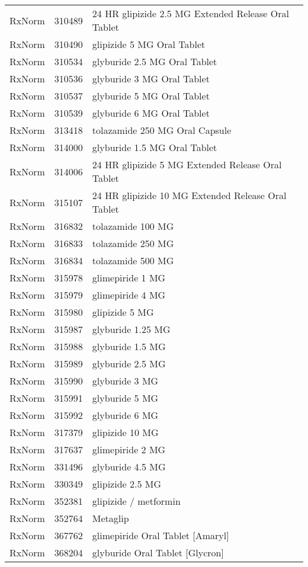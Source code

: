 \begin{longtable}{p{}p{}p{}}
  RxNorm & 310489 & 24 HR glipizide 2.5 MG Extended Release Oral Tablet \\ 
  RxNorm & 310490 & glipizide 5 MG Oral Tablet \\ 
  RxNorm & 310534 & glyburide 2.5 MG Oral Tablet \\ 
  RxNorm & 310536 & glyburide 3 MG Oral Tablet \\ 
  RxNorm & 310537 & glyburide 5 MG Oral Tablet \\ 
  RxNorm & 310539 & glyburide 6 MG Oral Tablet \\ 
  RxNorm & 313418 & tolazamide 250 MG Oral Capsule \\ 
  RxNorm & 314000 & glyburide 1.5 MG Oral Tablet \\ 
  RxNorm & 314006 & 24 HR glipizide 5 MG Extended Release Oral Tablet \\ 
  RxNorm & 315107 & 24 HR glipizide 10 MG Extended Release Oral Tablet \\ 
  RxNorm & 316832 & tolazamide 100 MG \\ 
  RxNorm & 316833 & tolazamide 250 MG \\ 
  RxNorm & 316834 & tolazamide 500 MG \\ 
  RxNorm & 315978 & glimepiride 1 MG \\ 
  RxNorm & 315979 & glimepiride 4 MG \\ 
  RxNorm & 315980 & glipizide 5 MG \\ 
  RxNorm & 315987 & glyburide 1.25 MG \\ 
  RxNorm & 315988 & glyburide 1.5 MG \\ 
  RxNorm & 315989 & glyburide 2.5 MG \\ 
  RxNorm & 315990 & glyburide 3 MG \\ 
  RxNorm & 315991 & glyburide 5 MG \\ 
  RxNorm & 315992 & glyburide 6 MG \\ 
  RxNorm & 317379 & glipizide 10 MG \\ 
  RxNorm & 317637 & glimepiride 2 MG \\ 
  RxNorm & 331496 & glyburide 4.5 MG \\ 
  RxNorm & 330349 & glipizide 2.5 MG \\ 
  RxNorm & 352381 & glipizide / metformin \\ 
  RxNorm & 352764 & Metaglip \\ 
  RxNorm & 367762 & glimepiride Oral Tablet [Amaryl] \\ 
  RxNorm & 368204 & glyburide Oral Tablet [Glycron] \\ 

\end{longtable}

